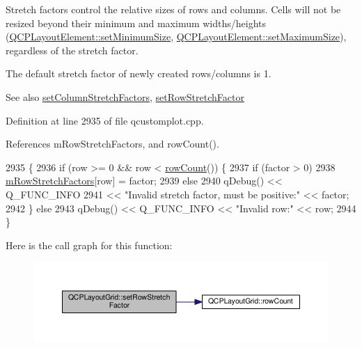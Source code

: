Stretch factors control the relative sizes of rows and columns. Cells will not be resized beyond their minimum and maximum widths/heights (\hyperlink{class_q_c_p_layout_element_a5dd29a3c8bc88440c97c06b67be7886b}{Q\+C\+P\+Layout\+Element\+::set\+Minimum\+Size}, \hyperlink{class_q_c_p_layout_element_a74eb5280a737ab44833d506db65efd95}{Q\+C\+P\+Layout\+Element\+::set\+Maximum\+Size}), regardless of the stretch factor.

The default stretch factor of newly created rows/columns is 1.

\begin{DoxySeeAlso}{See also}
\hyperlink{class_q_c_p_layout_grid_a6c2591d1a7e2534ce036989543b49e57}{set\+Column\+Stretch\+Factors}, \hyperlink{class_q_c_p_layout_grid_a7b0273de5369bd93d942edbaf5b166ec}{set\+Row\+Stretch\+Factor} 
\end{DoxySeeAlso}


Definition at line 2935 of file qcustomplot.\+cpp.



References m\+Row\+Stretch\+Factors, and row\+Count().


\begin{DoxyCode}
2935                                                               \{
2936   \textcolor{keywordflow}{if} (row >= 0 && row < \hyperlink{class_q_c_p_layout_grid_af8e6c7a05864ebe610c87756c7b9079c}{rowCount}()) \{
2937     \textcolor{keywordflow}{if} (factor > 0)
2938       \hyperlink{class_q_c_p_layout_grid_a36c85a7eaf342680fb9b8a4977486f16}{mRowStretchFactors}[row] = factor;
2939     \textcolor{keywordflow}{else}
2940       qDebug() << Q\_FUNC\_INFO
2941                << \textcolor{stringliteral}{"Invalid stretch factor, must be positive:"} << factor;
2942   \} \textcolor{keywordflow}{else}
2943     qDebug() << Q\_FUNC\_INFO << \textcolor{stringliteral}{"Invalid row:"} << row;
2944 \}
\end{DoxyCode}


Here is the call graph for this function\+:\nopagebreak
\begin{figure}[H]
\begin{center}
\leavevmode
\includegraphics[width=350pt]{class_q_c_p_layout_grid_a7b0273de5369bd93d942edbaf5b166ec_cgraph}
\end{center}
\end{figure}


